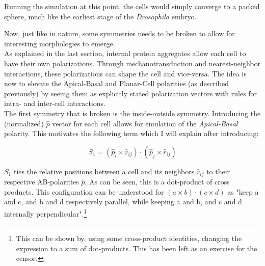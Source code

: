 Running the simulation at this point, the cells would simply converge to a packed sphere, much like the earliest stage of the \textit{Drosophila} embryo.






Now, just like in nature, some symmetries needs to be broken to allow for interesting morphologies to emerge.\\

As explained in the last section, internal protein aggregates allow each cell to have their own polarizations. Through mechanotransduction and nearest-neighbor interactions, these polarizations can shape the cell and vice-versa. The idea is now to elevate the Apical-Basal and Planar-Cell polarities (as described previously) by seeing them as explicitly stated polarization vectors with rules for intra- and inter-cell interactions. \\

The first symmetry that is broken is the inside-outside symmetry. Introducing the (normalized) $\hat{p}$ vector for each cell allows for emulation of the \textit{Apical-Basal} polarity.
This motivates the following term which I will explain after introducing:

\begin{equation*}
    S_1=\left(\hat{p}_i \times \hat{r}_{i j}\right) \cdot\left(\hat{p}_j \times \hat{r}_{i j}\right)
\end{equation*}

$S_1$ ties the relative positions between a cell and its neighbors $\hat{r}_{i j}$ to their respective AB-polarities $\hat{p}$.
As can be seen, this is a dot-product of cross products. This configuration can be understood for $\left(a \times b\right) \cdot\left(c \times d\right)$ as "keep a and c, and b and d respectively parallel, while keeping a and b, and c and d internally perpendicular".\footnote{This can be shown by, using some cross-product identities, changing the expression to a sum of dot-products. This has been left as an exercise for the censor.} \\ 

